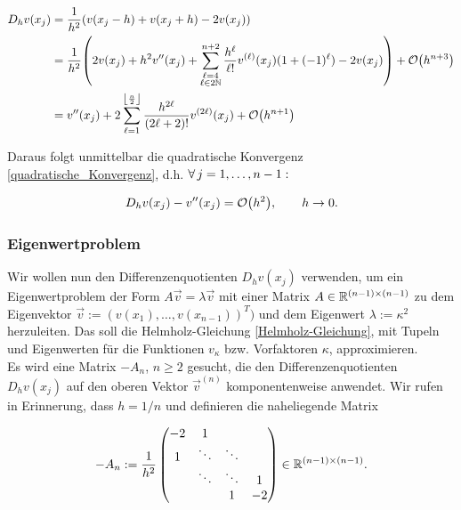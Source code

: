 \begin{align*}
  D_h v(x_j)
  & = \frac{1}{h^2} {\left ( 
    v(x_j - h) + v(x_j + h) - 2 v(x_j)
   \right )} \\
  & = \frac{1}{h^2} {\left ( 
        2 v(x_j) +
        h^2 v^{\prime \prime}(x_j) +
        \sum_{\substack{\ell = 4 \\ \ell \in 2 \mathbb{N}}}^{n+2}
        \frac{h^\ell}{\ell !}
        v^{(\ell)}(x_j)
        (1 + (-1)^\ell) -
        2 v(x_j)
       \right )} +
      \mathcal{O} {\left ( h^{n+3} \right )} \\
  & = v^{\prime \prime}(x_j) +
      2 \sum_{\ell = 1}^{\left \lfloor \frac{n}{2} \right \rfloor}
      \frac{h^{2 \ell}}{(2 \ell + 2)!}
      v^{(2 \ell)}(x_j) +
      \mathcal{O} {\left ( h^{n+1} \right )}
\end{align*}

Daraus folgt unmittelbar die quadratische Konvergenz \eqref{quadratische_Konvergenz}, d.h. $\forall \, j = 1, \ldots, n-1:$

\begin{align*}
  D_h v(x_j) - v^{\prime \prime}(x_j) = \mathcal{O} {\left ( h^2 \right )}, \qquad
  h \to 0.
\end{align*}

\subsubsection{Eigenwertproblem}

Wir wollen nun den Differenzenquotienten $D_h v(x_j)$ verwenden, um ein Eigenwertproblem der Form $A \vec v = \lambda \vec v$ mit einer Matrix $A \in \mathbb{R}^{(n-1) \times (n-1)}$ zu dem Eigenvektor $\vec v := (v(x_1), \ldots, v(x_{n-1}))^T)$ und dem Eigenwert $\lambda := \kappa^2$ herzuleiten. Das soll die Helmholz-Gleichung \eqref{Helmholz-Gleichung}, mit Tupeln und Eigenwerten für die Funktionen $v_\kappa$ bzw. Vorfaktoren $\kappa$, approximieren. \\

Es wird eine Matrix $-A_n$, $n \geq 2$ gesucht, die den Differenzenquotienten $D_h v(x_j)$ auf den oberen Vektor $\vec v^{(n)}$ komponentenweise anwendet. Wir rufen in Erinnerung, dass $h = 1/n$ und definieren die naheliegende Matrix

\begin{align*}
  -A_n :=
  \frac{1}{h^2}
  \begin{pmatrix}
    -2 &  1      &        &    \\
     1 &  \ddots & \ddots &    \\
       &  \ddots & \ddots &  1 \\
       &         & 1      & -2
  \end{pmatrix}
  \in \mathbb{R}^{(n-1) \times (n-1)}.
\end{align*}

